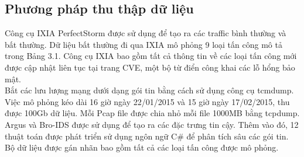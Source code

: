 \subsection{Phương pháp thu thập dữ liệu}

Công cụ IXIA PerfectStorm\cite{ixia} được sử dụng để tạo ra các traffic bình thường và bất thường. Dữ liệu bất thường đi qua IXIA mô phỏng 9 loại tấn công mô tả trong Bảng 3.1. Công cụ IXIA bao gồm tất cả thông tin về các loại tấn công mới được cập nhật liên tục tại trang CVE\cite{cve}, một bộ từ điển công khai các lỗ hổng bảo mật.\\
Bắt các lưu lượng mạng dưới dạng gói tin bằng cách sử dụng công cụ tcmdump. Việc mô phỏng kéo dài 16 giờ ngày 22/01/2015 và 15 giờ ngày 17/02/2015, thu được 100Gb dữ liệu. Mỗi Pcap file được chia nhỏ mỗi file 1000MB bằng tcpdump. Argus và Bro-IDS được sử dụng để tạo ra các đặc trưng tin cậy. Thêm vào đó, 12 thuật toán được phát triển sử dụng ngôn ngữ C\# để phân tích sâu các gói tin. Bộ dữ liệu được gán nhãn bao gồm tất cả các loại tấn công được mô phỏng. 

